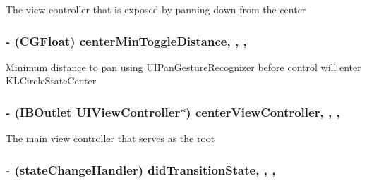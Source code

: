 The view controller that is exposed by panning down from the center \hypertarget{interface_k_l_circle_view_controller_aa9a4807e51d3a892ea996db5ced2826b}{
\subsubsection[{center\-Min\-Toggle\-Distance}]{\setlength{\rightskip}{0pt plus 5cm}-\/ (C\-G\-Float) center\-Min\-Toggle\-Distance\hspace{0.3cm}{\ttfamily [read]}, {\ttfamily [write]}, {\ttfamily [nonatomic]}, {\ttfamily [assign]}}}\label{interface_k_l_circle_view_controller_aa9a4807e51d3a892ea996db5ced2826b}
Minimum distance to pan using U\-I\-Pan\-Gesture\-Recognizer before control will enter K\-L\-Circle\-State\-Center \hypertarget{interface_k_l_circle_view_controller_a1b18d36e82e8bcbb3ceb88fc35ba255d}{
\subsubsection[{center\-View\-Controller}]{\setlength{\rightskip}{0pt plus 5cm}-\/ (I\-B\-Outlet U\-I\-View\-Controller$\ast$) center\-View\-Controller\hspace{0.3cm}{\ttfamily [read]}, {\ttfamily [write]}, {\ttfamily [nonatomic]}, {\ttfamily [strong]}}}\label{interface_k_l_circle_view_controller_a1b18d36e82e8bcbb3ceb88fc35ba255d}
The main view controller that serves as the root \hypertarget{interface_k_l_circle_view_controller_a6567be383fb25fca18a02eee82f34be7}{
\subsubsection[{did\-Transition\-State}]{\setlength{\rightskip}{0pt plus 5cm}-\/ (state\-Change\-Handler) did\-Transition\-State\hspace{0.3cm}{\ttfamily [read]}, {\ttfamily [write]}, {\ttfamily [nonatomic]}, {\ttfamily [copy]}}}\label{interface_k_l_circle_view_controller_a6567be383fb25fca18a02eee82f34be7}
